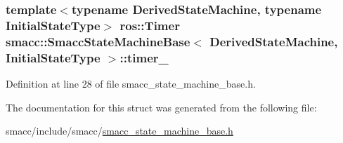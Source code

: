 \subsubsection[{\texorpdfstring{timer\+\_\+}{timer_}}]{\setlength{\rightskip}{0pt plus 5cm}template$<$typename Derived\+State\+Machine, typename Initial\+State\+Type$>$ ros\+::\+Timer {\bf smacc\+::\+Smacc\+State\+Machine\+Base}$<$ Derived\+State\+Machine, Initial\+State\+Type $>$\+::timer\+\_\+}\hypertarget{structsmacc_1_1SmaccStateMachineBase_a7fc7227a0c6321cf7253683a1f38c4f8}{}\label{structsmacc_1_1SmaccStateMachineBase_a7fc7227a0c6321cf7253683a1f38c4f8}


Definition at line 28 of file smacc\+\_\+state\+\_\+machine\+\_\+base.\+h.



The documentation for this struct was generated from the following file\+:\begin{DoxyCompactItemize}
\item 
smacc/include/smacc/\hyperlink{smacc__state__machine__base_8h}{smacc\+\_\+state\+\_\+machine\+\_\+base.\+h}\end{DoxyCompactItemize}
